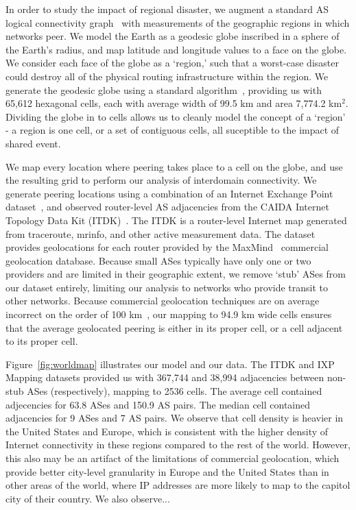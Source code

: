     In order to study the impact of regional disaster, we augment a standard AS logical connectivity graph~\cite{caida-asgraph} with measurements of the geographic regions in which networks peer.
    We model the Earth as a geodesic globe inscribed in a sphere of the Earth's radius, and map latitude and longitude values to a face on the globe.
    We consider each face of the globe as a `region,' such that a worst-case disaster could destroy all of the physical routing infrastructure within the region.
    We generate the geodesic globe using a standard algorithm~\cite{geodesic}, providing us with 65,612 hexagonal cells, each with average width of 99.5 km and area 7,774.2 km$^2$.  
    Dividing the globe in to cells allows us to cleanly model the concept of a `region' - a region is one cell, or a set of contiguous cells, all suceptible to the impact of shared event. 
     
    We map every location where peering takes place to a cell on the globe, and use the resulting grid to perform our analysis of interdomain connectivity.
    We generate peering locations using a combination of an Internet Exchange Point dataset~\cite{ixps-mapped}, and observed router-level AS adjacencies from the CAIDA Internet Topology Data Kit (ITDK)~\cite{itdk}.
    The ITDK is a router-level Internet map generated from traceroute, mrinfo, and other active measurement data.
    The dataset provides geolocations for each router provided by the MaxMind~\cite{maxmind} commercial geolocation database.
    Because small ASes typically have only one or two providers and are limited in their geographic extent, we remove `stub' ASes from our dataset entirely, limiting our analysis to networks who provide transit to other networks.
    Because commercial geolocation techniques are on average incorrect on the order of 100 km~\cite{geoloc_accuracy}, our mapping to 94.9 km wide cells ensures that the average geolocated peering is either in its proper cell, or a cell adjacent to its proper cell.
    
    
    Figure~\ref{fig:worldmap} illustrates our model and our data.
    The ITDK and IXP Mapping datasets provided us with 367,744 and 38,994 adjacencies between non-stub ASes (respectively), mapping to 2536 cells.
    The average cell contained adjecencies for 63.8 ASes and 150.9 AS pairs.
    The median cell contained adjacencies for 9 ASes and 7 AS pairs.
    We observe that cell density is heavier in the United States and Europe, which is consistent with the higher density of Internet connectivity in these regions compared to the rest of the world.
    However, this also may be an artifact of the limitations of commercial geolocation, which provide better city-level granularity in Europe and the United States than in other areas of the world, where IP addresses are more likely to map to the capitol city of their country.
    We also observe... 

